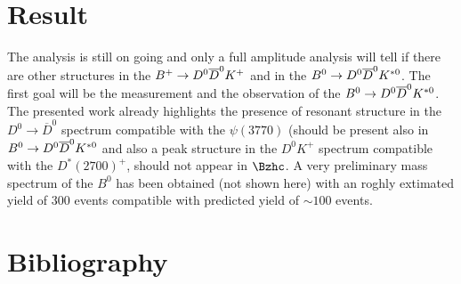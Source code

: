 \documentclass[11pt]{article}
\begin{document}
\section{Result}
The analysis is still on going and only a full amplitude analysis will tell if there are other structures in the $B^{+} \rightarrow D^0 \overline{D}^{0} K^{+}$ and in the $B^{0} \rightarrow D^0 \overline{D}^{0} K^{\ast 0}$. The first goal will be the measurement and the observation of the $B^{0} \rightarrow D^0 \overline{D}^{0} K^{\ast 0}$. The presented work already highlights the presence of resonant structure in the $D^{0} \rightarrow \overline{D} ^{0} $ spectrum compatible with the $\psi (3770)$ (should be present also in $B^{0} \rightarrow D^0 \overline{D}^{0} K^{\ast 0}$ and also a peak structure in the $D^{0} K^{+} $ spectrum compatible with the $D^{*}(2700)^{+}$, should not appear in $\Bzhc$.
A very preliminary mass spectrum of the $B^{0}$ has been obtained (not shown here) with an roghly extimated yield of 300 events compatible with predicted yield of $\sim 100 $ events.

\section{Bibliography}
\end{document}
